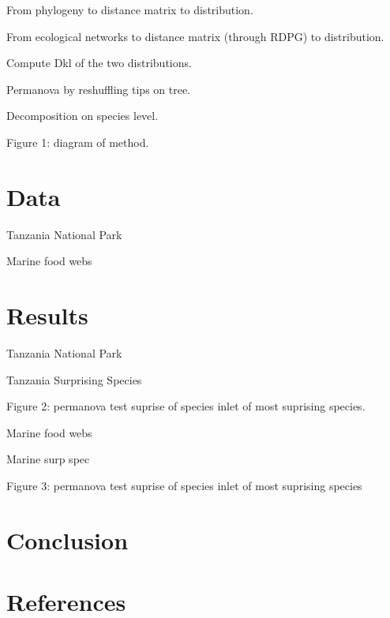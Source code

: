 \documentclass[11pt]{article}
\begin{document}
From phylogeny to distance matrix to distribution.

From ecological networks to distance matrix (through RDPG) to
distribution.

Compute Dkl of the two distributions.

Permanova by reshuffling tips on tree.

Decomposition on species level.

Figure 1: diagram of method.

\hypertarget{data}{%
\section{Data}\label{data}}

Tanzania National Park

Marine food webs

\hypertarget{results}{%
\section{Results}\label{results}}

Tanzania National Park

Tanzania Surprising Species

Figure 2: permanova test \textbar\textbar{} suprise of species
\textbar\textbar{} inlet of most suprising species.

Marine food webs

Marine surp spec

Figure 3: permanova test \textbar\textbar{} suprise of species
\textbar\textbar{} inlet of most suprising species

\hypertarget{conclusion}{%
\section{Conclusion}\label{conclusion}}

\hypertarget{references}{%
\section{References}\label{references}}
\end{document}
